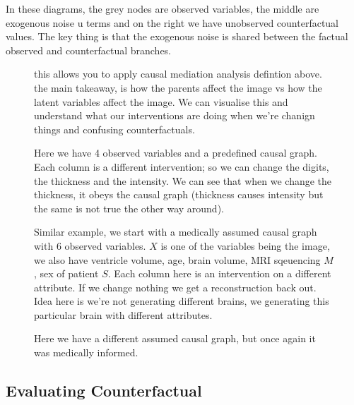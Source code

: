 \documentclass[11pt]{article}
\begin{document}
In these diagrams, the grey nodes are observed variables, the middle are exogenous noise u terms and on the right we have unobserved counterfactual values. The key thing is that the exogenous noise is shared between the factual observed and counterfactual branches.

\begin{figure}[H]
    \centering
    \caption{this allows you to apply causal mediation analysis defintion above. the main takeaway, is how the parents affect the image vs how the latent variables affect the image. We can visualise this and understand what our interventions are doing when we're chanign things and confusing counterfactuals.}
\end{figure}

\begin{figure}[H]
    \centering
    \caption{Here we have 4 observed variables and a predefined causal graph. Each column is a different intervention; so we can change the digits, the thickness and the intensity. We can see that when we change the thickness, it obeys the causal graph (thickness causes intensity but the same is not true the other way around).}
\end{figure}

\begin{figure}[H]
    \centering
    \caption{Similar example, we start with a medically assumed causal graph with 6 observed variables. $X$ is one of the variables being the image, we also have ventricle volume, age, brain volume, MRI sqeuencing $M$, sex of patient $S$. Each column here is an intervention on a different attribute. If we change nothing we get a reconstruction back out. Idea here is we're not generating different brains, we generating this particular brain with different attributes.}
\end{figure}

\begin{figure}[H]
    \centering
    \caption{Here we have a different assumed causal graph, but once again it was medically informed.}
\end{figure}

\subsection{Evaluating Counterfactual}
\end{document}
